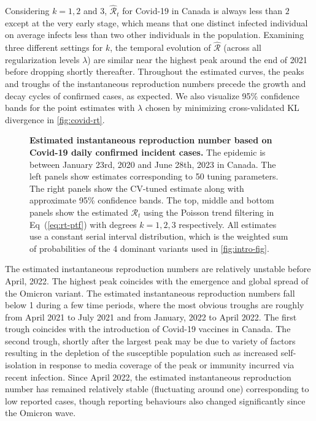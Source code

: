 \documentclass[10pt,letterpaper]{article}
\def\calR{\mathcal{R}}
\renewcommand{\eqref}[1]{Eq~(\ref{#1})}
\begin{document}
Considering $k=1,2$ and 3, $\widehat{\calR}_t$ for Covid-19 in Canada is always
less than $2$ except at the very early stage, which means that one distinct
infected individual on average infects less than two other individuals in the
population. Examining three different settings for $k$, the temporal evolution
of $\widehat{\calR}$ (across all regularization levels $\lambda$) are similar
near the highest peak around the end of 2021 before dropping shortly thereafter.
Throughout the estimated curves, the peaks and troughs of the instantaneous
reproduction numbers precede the growth and decay cycles of confirmed cases, as
expected. We also visualize 95\% confidence bands for the point estimates with
$\lambda$ chosen by minimizing cross-validated KL divergence in
\autoref{fig:covid-rt}.     

\begin{figure}[!t]
  \centering
  \caption{{\bf Estimated instantaneous reproduction number based on Covid-19 daily
  confirmed incident cases.} The epidemic is between January 23rd, 2020 and June 28th, 2023 in
  Canada. The left panels show estimates corresponding to 50 tuning parameters.
  The right panels show the CV-tuned estimate along with approximate 95\%
  confidence bands. The top, middle and bottom panels show the estimated
  $\calR_t$ using the Poisson trend filtering in \eqref{eq:rt-ptf} with degrees
  $k=1,2,3$ respectively. All estimates use a constant serial interval
  distribution, which is the weighted sum of probabilities of the 4 dominant
  variants used in \autoref{fig:intro-fig}.}
  \label{fig:covid-rt}
\end{figure} 

The estimated instantaneous reproduction numbers are relatively unstable before
April, 2022. The highest peak coincides with the emergence and global spread of
the Omicron variant. The estimated instantaneous reproduction numbers fall below
1 during a few time periods, where the most obvious troughs are roughly from
April 2021 to July 2021 and from January, 2022 to April 2022. The first trough
coincides with the introduction of Covid-19 vaccines in Canada. The second
trough, shortly after the largest peak may be due to variety of factors
resulting in the depletion of the susceptible population such as increased
self-isolation in response to media coverage of the peak or immunity incurred
via recent infection. Since April 2022, the estimated instantaneous reproduction
number has remained relatively stable (fluctuating around one) corresponding to
low reported cases, though reporting behaviours also changed significantly since
the Omicron wave. 
\end{document}
